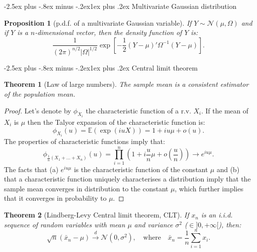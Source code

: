 \documentclass[
  11pt,
]{book}
\makeatletter
\renewcommand\subsection{\@startsection{subsection}{2}{\z@}
  {-2.5ex plus -.8ex minus -.2ex}{1ex plus .2ex}
  {\normalfont\large\bfseries\color{TextbookInk}}}
\newtheorem{theorem}{Theorem}[chapter]
\newtheorem{proposition}{Proposition}[chapter]
\theoremstyle{definition}
\theoremstyle{definition}
\theoremstyle{definition}
\theoremstyle{definition}
\theoremstyle{remark}
\makeatother
\begin{document}
\subsection{Multivariate Gaussian distribution}\label{multivariate-gaussian-distribution}

\begin{proposition}[p.d.f. of a multivariate Gaussian variable]
\protect\hypertarget{prp:pdfMultivarGaussian}{}\label{prp:pdfMultivarGaussian}If \(Y \sim \mathcal{N}(\mu,\Omega)\) and if \(Y\) is a \(n\)-dimensional vector, then the density function of \(Y\) is:
\[
\frac{1}{(2 \pi)^{n/2}|\Omega|^{1/2}}\exp\left[-\frac{1}{2}\left(Y-\mu\right)'\Omega^{-1}\left(Y-\mu\right)\right].
\]
\end{proposition}

\subsection{Central limit theorem}\label{CLTappend}

\begin{theorem}[Law of large numbers]
\protect\hypertarget{thm:LLNappendix}{}\label{thm:LLNappendix}The sample mean is a consistent estimator of the population mean.
\end{theorem}

\begin{proof}
Let's denote by \(\phi_{X_i}\) the characteristic function of a r.v. \(X_i\). If the mean of \(X_i\) is \(\mu\) then the Talyor expansion of the characteristic function is:
\[
\phi_{X_i}(u) = \mathbb{E}(\exp(iuX)) = 1 + iu\mu + o(u).
\]
The properties of characteristic functions imply that:
\[
\phi_{\frac{1}{n}(X_1+\dots+X_n)}(u) = \prod_{i=1}^{n} \left(1 + i\frac{u}{n}\mu + o\left(\frac{u}{n}\right) \right) \rightarrow e^{iu\mu}.
\]
The facts that (a) \(e^{iu\mu}\) is the characteristic function of the constant \(\mu\) and (b) that a characteristic function uniquely characterises a distribution imply that the sample mean converges in distribution to the constant \(\mu\), which further implies that it converges in probability to \(\mu\).
\end{proof}

\begin{theorem}[Lindberg-Levy Central limit theorem, CLT]
\protect\hypertarget{thm:LindbergLevyCLT}{}\label{thm:LindbergLevyCLT}If \(x_n\) is an i.i.d. sequence of random variables with mean \(\mu\) and variance \(\sigma^2\) (\(\in ]0,+\infty[\)), then:
\[
\boxed{\sqrt{n} (\bar{x}_n - \mu) \overset{d}{\rightarrow} \mathcal{N}(0,\sigma^2), \quad \mbox{where} \quad \bar{x}_n = \frac{1}{n} \sum_{i=1}^{n} x_i.}
\]
\end{theorem}
\end{document}
